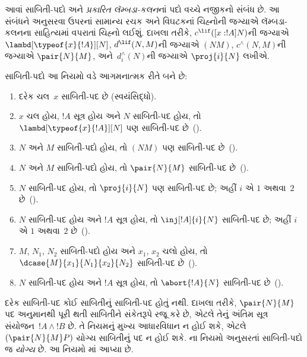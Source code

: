 આવાં સાબિતી-પદો અને \emph{પ્રકારિત લૅમ્બડા-કલન}નાં
પદો વચ્ચે નજીકનો સંબંધ છે. આ સંબંધને
અનુસરવા ઉપરનાં સામાન્ય રચક અને વિઘટકનાં
ચિહ્નોની જગ્યાએ લૅમ્બડા-કલનના સાહિત્યમાં
વપરાતાં ચિહ્નો લઈશું. દાખલા તરીકે,
$c^{\lif}([x:!A]N)$ની જગ્યાએ
$\lambd[\typeof{x}{!A}][N]$,
$d^{\lif}(N,M)$ની જગ્યાએ $(NM)$,
$c^\land(N,M)$ની જગ્યાએ $\pair{N}{M}$,
અને~$d^\land_i(N)$ની જગ્યાએ $\proj{i}{N}$
લખીએ.

\begin{defn}
  સાબિતી-પદો આ નિયમો વડે આગમનાત્મક રીતે બને છે:
  \begin{enumerate}
  \item દરેક ચલ~$x$ સાબિતી-પદ છે (સ્વયંસિદ્ધો).
  \item $x$ ચલ હોય, $!A$ સૂત્ર હોય અને
    $N$ સાબિતી-પદ હોય, તો $\lambd[\typeof{x}{!A}][N]$
    પણ સાબિતી-પદ છે~(\Intro\lif).
  \item $N$ અને $M$ સાબિતી-પદો હોય, તો
    $(NM)$ પણ સાબિતી-પદ છે~(\Elim\lif).
  \item $N$ અને $M$ સાબિતી-પદો હોય, તો
    $\pair{N}{M}$ સાબિતી-પદ છે~(\Intro\land).
  \item $N$ સાબિતી-પદ હોય, તો $\proj{i}{N}$
    પણ સાબિતી-પદ છે; અહીં $i$ એ $1$ અથવા~$2$
    છે~(\Elim\land[i]).
  \item $N$ સાબિતી-પદ હોય અને $!A$ સૂત્ર હોય,
    તો $\inj[!A]{i}{N}$ સાબિતી-પદ છે;
    અહીં $i$ એ $1$ અથવા~$2$ છે~(\Intro\lor[i]).
  \item $M$, $N_1$, $N_2$ સાબિતી-પદો હોય
    અને $x_1$, $x_2$ ચલો હોય, તો
    $\dcase{M}{x_1}{N_1}{x_2}{N_2}$
    સાબિતી-પદ છે~(\Elim\lor).
  \item $N$ સાબિતી-પદ હોય અને $!A$
    સૂત્ર હોય, તો $\abort{!A}{N}$
    સાબિતી-પદ છે~(\FalseInt).
  \end{enumerate}
\end{defn}

દરેક સાબિતી-પદ કોઈ સાબિતીનું
સાબિતી-પદ હોતું નથી. દાખલા તરીકે,
$\pair{N}{M}$ પદ \Intro{\land}
અનુમાનથી પૂરી થતી સાબિતીને સંકેતરૂપે
રજૂ કરે છે, એટલે તેનું અંતિમ સૂત્ર
સંયોજન~$!A \land !B$ છે. તે
\Elim{\lif} નિયમનું મુખ્ય આધારવિધાન
ન હોઈ શકે, એટલે $(\pair{N}{M}P)$
યોગ્ય સાબિતીનું પદ ન હોઈ શકે.
ના નિયમો અનુસરતાં
સાબિતી-પદો જ \emph{યોગ્ય} છે.
આ નિયમો માં આપ્યા છે.

\begingroup
\makeatletter{}\makeatother

\label{guunit:OLP-0692}



